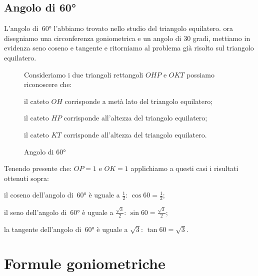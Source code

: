 \subsection{Angolo di 60°}

L'angolo di~60° l'abbiamo trovato nello studio del triangolo equilatero. ora 
disegniamo una circonferenza goniometrica e un angolo di 30 gradi, mettiamo in 
evidenza seno coseno e tangente e ritorniamo al problema già risolto sul 
triangolo equilatero.

 \begin{figure}[!h]
 \begin{minipage}{.45\textwidth}
  \begin{center}
\begin{inaccessibleblock}
    
    \caption{Angolo di 60°}
    \label{fig:trigo_angolo_60}
\end{inaccessibleblock}
  \end{center}
 \end{minipage}
 \begin{minipage}{.45\textwidth}
Consideriamo i due triangoli rettangoli $OHP$ e $OKT$ possiamo riconoscere che:
\begin{itemize*}
 \item il cateto $OH$ corrisponde a metà lato del triangolo equilatero; 
 \item il cateto $HP$ corrisponde all'altezza del triangolo equilatero;
 \item il cateto $KT$ corrisponde all'altezza del triangolo equilatero.
\end{itemize*}
 \end{minipage}
\vspace{-12pt}
\end{figure}

Tenendo presente che: $OP=1$ e $OK=1$ applichiamo a questi casi i risultati 
ottenuti sopra:
\begin{itemize*}
 \item il coseno dell'angolo di~60° è uguale a $\frac{1}{2}$: 
  $\cos 60 = \frac{1}{2}$; 
 \item il seno dell'angolo di~60° è uguale a $\frac{\sqrt{3}}{2}$: 
  $\sin 60 = \frac{\sqrt{3}}{2}$; 
 \item la tangente dell'angolo di~60° è uguale a $\sqrt{3}$: 
  $\tan 60 = \sqrt{3}$.
\end{itemize*}

\section{Formule goniometriche}
\label{sec:gonio_formule}


